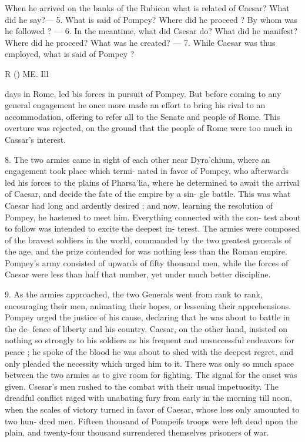 \documentclass[openany,a4paper]{memoir}
\begin{document}
When he arrived on the banks of the Rubicon what is related of 
Caesar? What did he say?— 5. What is said of Pompey? Where did 
he proceed ? By whom was he followed ? — 6. In the meantime, what 
did Csesar do? What did he manifest? Where did he proceed? 
What was he created? — 7. While Caesar was thus employed, what is 
said of Pompey ? 



R () ME. Ill 

days in Rome, led bis forces in pursuit of Pompey. But before 
coming to any general engagement he once more made an 
effort to bring his rival to an accommodation, offering to 
refer all to the Senate and people of Rome. This overture 
was rejected, on the ground that the people of Rome were 
too much in Cassar's interest. 

8. The two armies came in sight of each other near 
Dyra'chium, where an engagement took place which termi- 
nated in favor of Pompey, who afterwards led his forces to 
the plains of Pharsa'lia, where he determined to await the 
arrival of Caesar, and decide the fate of the empire by a sin- 
gle battle. This was what Caesar had long and ardently 
desired ; and now, learning the resolution of Pompey, he 
hastened to meet him. Everything connected with the con- 
test about to follow was intended to excite the deepest in- 
terest. The armies were composed of the bravest soldiers in 
the world, commanded by the two greatest generals of the 
age, and the prize contended for was nothing less than the 
Roman empire. Pompey's army consisted of upwards of 
fifty thousand men, while the forces of Caesar were less than 
half that number, yet under much better discipline. 

9. As the armies approached, the two Generals went from 
rank to rank, encouraging their men, animating their hopes, 
or lessening their apprehensions. Pompey urged the justice 
of his cause, declaring that he was about to battle in the de- 
fence of liberty and his country. Caesar, on the other hand, 
insisted on nothing so strongly to his soldiers as his frequent 
and unsuccessful endeavors for peace ; he spoke of the blood 
he was about to shed with the deepest regret, and only pleaded 
the necessity which urged him to it. There was only so 
much space between the two armies as to give room for 
fighting. The signal for the onset was given. Csesar's 
men rushed to the combat with their usual impetuosity. 
The dreadful conflict raged with unabating fury from early 
in the morning till noon, when the scales of victory turned 
in favor of Caesar, whose loss only amounted to two hun- 
dred men. Fifteen thousand of Pompeifs troops were left 
dead upon the plain, and twenty-four thousand surrendered 
themselves prisoners of war. 
\end{document}
